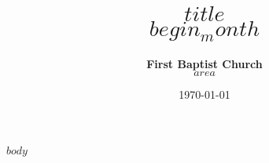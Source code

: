 \documentclass[12pt]{diazessay} %
\title{\textbf{$title$} \\ {\Large\itshape $begin_month$}} %
\author{\textbf{First Baptist Church} \\ \textit{$area$}} %
\date{\today} %
\begin{document}
\maketitle %


{$body$}
\end{document}

